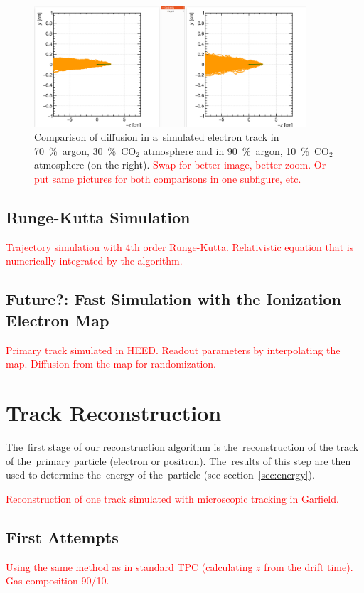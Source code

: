 \documentclass[]{article}
\begin{document}
			\begin{figure}
				\centering
				\includegraphics[width=0.9\textwidth]{diff_comp.png}
				\caption{Comparison of diffusion in a~simulated electron track in 70~\%~argon, 30~\%~CO$_2$ atmosphere and in 90~\%~argon, 10~\%~CO$_2$ atmosphere (on the right). \textcolor{red}{Swap for better image, better zoom. Or put same pictures for both comparisons in one subfigure, etc.}}
				\label{fig:diffcomp}
			\end{figure}
			
		\subsection{Runge-Kutta Simulation}
		\label{sec:rks}
			\textcolor{red}{Trajectory simulation with 4th order Runge-Kutta. Relativistic equation that is numerically integrated by the algorithm.}
			
		\subsection{Future?: Fast Simulation with the Ionization Electron Map}
			\textcolor{red}{Primary track simulated in HEED. Readout parameters by interpolating the map. Diffusion from the map for randomization.}
	
	\section{Track Reconstruction}
	\label{sec:track}
		The~first stage of our reconstruction algorithm is the~reconstruction of the track of the~primary particle (electron or positron). The~results of this step are then used to determine the~energy of the~particle (see section~\ref{sec:energy}).
		
		\textcolor{red}{Reconstruction of one track simulated with microscopic tracking in Garfield.}
		
		\subsection{First Attempts}
			\textcolor{red}{Using the same method as in standard TPC (calculating $z$ from the drift time). Gas composition 90/10.}
			
\end{document}
